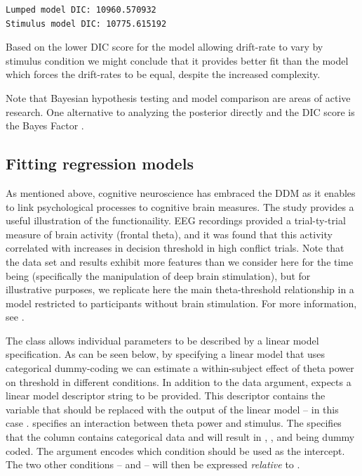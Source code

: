 \documentclass[letterpaper,10pt,english]{article}
\begin{document}
\begin{Verbatim}[commandchars=\\\{\}]
Lumped model DIC: 10960.570932
Stimulus model DIC: 10775.615192
\end{Verbatim}

Based on the lower DIC score for the model allowing drift-rate to vary
by stimulus condition we might conclude that it provides better fit
than the model which forces the drift-rates to be equal, despite the
increased complexity.

Note that Bayesian hypothesis testing and model comparison are areas
of active research.  One alternative to analyzing the posterior
directly and the DIC score is the Bayes Factor
\citep[e.g.][]{WagenmakersLodewyckxKuriyalEtAl10}.

\subsection*{Fitting regression models}
\label{demo:fitting-regression-models}
As mentioned above, cognitive neuroscience has embraced the DDM as it
enables to link psychological processes to cognitive brain measures.
The \citet{CavanaghWieckiCohenEtAl11} study provides a useful
illustration of the functionaility. EEG recordings provided a
trial-ty-trial measure of brain activity (frontal theta), and it was
found that this activity correlated with increases in decision
threshold in high conflict trials. Note that the data set and results
exhibit more features than we consider here for the time being
(specifically the manipulation of deep brain stimulation), but for
illustrative purposes, we replicate here the main theta-threshold
relationship in a model restricted to participants without brain
stimulation. For more information, see
\citet{CavanaghWieckiCohenEtAl11}.

The  class allows individual parameters to be
described by a linear model specification. As can be seen below, by
specifying a linear model that uses categorical dummy-coding we can
estimate a within-subject effect of theta power on threshold in
different conditions. In addition to the data argument,
 expects a linear model descriptor string to be
provided. This descriptor contains the  variable that
should be replaced with the output of the linear model -- in this case
.  specifies an interaction between theta
power and stimulus. The  specifies that the 
column contains categorical data and will result in ,
, and  being dummy coded. The 
argument encodes which condition should be used as the intercept. The
two other conditions --  and  -- will then be
expressed \textit{relative} to .
\end{document}
